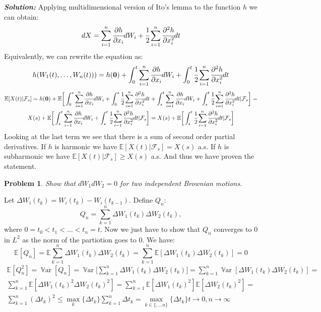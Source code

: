 \documentclass[a4paper, 12pt]{article}
\theoremstyle{problemstyle}
\newtheorem{problem}{Problem}[section]
\newenvironment{solution}
{\textit{\textbf{Solution:}}}
{}
\newcommand{\E}{\mathbb{E}}
\DeclareMathOperator{\Var}{\mathbb{V}ar}
\begin{document}
\begin{solution}
	Applying multidimensional version of Ito's lemma to the function $h$ we can obtain:
	$$
	dX = \sum_{i=1}^n \cfrac{\partial h}{\partial x_i} dW_i + \cfrac{1}{2} \sum_{i=1}^n \cfrac{\partial^2 h}{\partial x_i^2} dt
	$$
	Equivalently, we can rewrite the equation as:
	$$
	h(W_1(t), \ldots, W_n(t)) ) = h(\boldsymbol{0}) + \int_0^t  \sum_{i=1}^n \cfrac{\partial h}{\partial x_i} dW_i + \int_0^t\cfrac{1}{2} \sum_{i=1}^n \cfrac{\partial^2 h}{\partial x_i^2} dt
	$$
	\begin{multline*}
		\E[X(t)| \mathcal{F}_s] = h(\boldsymbol{0})  + \E\bigg[ \int_0^s  \sum_{i=1}^n \cfrac{\partial h}{\partial x_i} dW_i + \int_0^s\cfrac{1}{2} \sum_{i=1}^n \cfrac{\partial^2 h}{\partial x_i^2} dt + \int_s^t  \sum_{i=1}^n \cfrac{\partial h}{\partial x_i} dW_i + \int_s^t\cfrac{1}{2} \sum_{i=1}^n \cfrac{\partial^2 h}{\partial x_i^2} dt | \mathcal{F}_s \bigg ] =  \\
		X(s) + \E \bigg[ \int_s^t  \sum_{i=1}^n \cfrac{\partial h}{\partial x_i} dW_i + \int_s^t\cfrac{1}{2} \sum_{i=1}^n \cfrac{\partial^2 h}{\partial x_i^2} dt | \mathcal{F}_s \bigg ] = X(s) + \E \bigg[ \int_s^t\cfrac{1}{2} \sum_{i=1}^n \cfrac{\partial^2 h}{\partial x_i^2} dt | \mathcal{F}_s \bigg ]
	\end{multline*}
	Looking at the last term we see that there is a sum of second order partial derivatives. If $h$ is harmonic we have $\E[X(t)|\mathcal{F}_s] = X(s)$ a.s. If  $h$ is subharmonic we have $\E[X(t)|\mathcal{F}_s] \geq X(s)$ a.s. And thus we have proven the statement.

\end{solution}

\begin{problem}
	Show that $dW_1 dW_2 = 0 $ for two independent Brownian motions.
\end{problem}
Let $\Delta W_i(t_k)  = W_i(t_k) - W_i(t_{k-1})$.
Define $Q_n$:
$$
Q_n = \sum_{k=1}^n  \Delta W_1(t_k) \Delta W_2(t_k),
$$
where $0 = t_0 < t_1 < \ldots <t_n = t$. Now we just have to show that $Q_n$ converges to $0$ in $L^2$ as the norm of the partiotion goes to $0$. We have:
$$
\E[Q_n] = \E \sum_{k=1}^n  \Delta W_1(t_k) \Delta W_2(t_k)  =  \sum_{k=1}^n  \E[ \Delta W_1(t_k) \Delta W_2(t_k)] = 0
$$
\begin{multline*}
\E[Q_n^2] = \Var[Q_n]  = \Var\bigg[ \sum_{k=1}^n  \Delta W_1(t_k) \Delta W_2(t_k)  \bigg] = 
 \sum_{k=1}^n \Var[\Delta W_1(t_k) \Delta W_2(t_k)] = \\
 \sum_{k=1}^n  \E[\Delta W_1(t_k)^2 \Delta W_2(t_k)^2] = \sum_{k=1}^n  \E[\Delta W_1(t_k)^2] \E[\Delta W_2(t_k)^2]  = \\ \sum_{k=1}^n  (\Delta t_k)^2 \leq 
 \max_k \{\Delta t_k \} \sum_{k=1}^n \Delta t_k =  \max_{k \in \{, \ldots n\}} \{\Delta t_k \} t \to 0, n \to \infty
\end{multline*}
\end{document}
